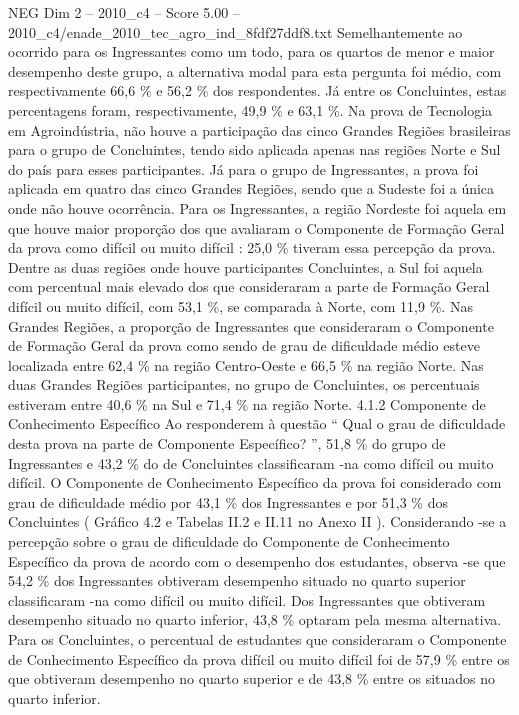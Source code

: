 \begin{textsample}{NEG Dim 2 – 2010\_c4 – Score 5.00 – 2010\_c4/enade\_2010\_tec\_agro\_ind\_8fdf27ddf8.txt}
Semelhantemente ao ocorrido para os Ingressantes como um todo, para os quartos de menor e maior desempenho deste grupo, a alternativa modal para esta pergunta foi médio, com respectivamente 66,6 \% e 56,2 \% dos respondentes.
Já entre os Concluintes, estas percentagens foram, respectivamente, 49,9 \% e 63,1 \%.
Na prova de Tecnologia em Agroindústria, não houve a participação das cinco Grandes Regiões brasileiras para o grupo de Concluintes, tendo sido aplicada apenas nas regiões Norte e Sul do país para esses participantes.
Já para o grupo de Ingressantes, a prova foi aplicada em quatro das cinco Grandes Regiões, sendo que a Sudeste foi a única onde não houve ocorrência.
Para os Ingressantes, a região Nordeste foi aquela em que houve maior proporção dos que avaliaram o Componente de Formação Geral da prova como difícil ou muito difícil : 25,0 \% tiveram essa percepção da prova.
Dentre as duas regiões onde houve participantes Concluintes, a Sul foi aquela com percentual mais elevado dos que consideraram a parte de Formação Geral difícil ou muito difícil, com 53,1 \%, se comparada à Norte, com 11,9 \%.
Nas Grandes Regiões, a proporção de Ingressantes que consideraram o Componente de Formação Geral da prova como sendo de grau de dificuldade médio esteve localizada entre 62,4 \% na região Centro-Oeste e 66,5 \% na região Norte.
Nas duas Grandes Regiões participantes, no grupo de Concluintes, os percentuais estiveram entre 40,6 \% na Sul e 71,4 \% na região Norte. 4.1.2 Componente de Conhecimento Específico Ao responderem à questão “ Qual o grau de dificuldade desta prova na parte de Componente Específico? ”, 51,8 \% do grupo de Ingressantes e 43,2 \% do de Concluintes classificaram -na como difícil ou muito difícil.
O Componente de Conhecimento Específico da prova foi considerado com grau de dificuldade médio por 43,1 \% dos Ingressantes e por 51,3 \% dos Concluintes ( Gráfico 4.2 e Tabelas II.2 e II.11 no Anexo II ).
Considerando -se a percepção sobre o grau de dificuldade do Componente de Conhecimento Específico da prova de acordo com o desempenho dos estudantes, observa -se que 54,2 \% dos Ingressantes obtiveram desempenho situado no quarto superior classificaram -na como difícil ou muito difícil.
Dos Ingressantes que obtiveram desempenho situado no quarto inferior, 43,8 \% optaram pela mesma alternativa.
Para os Concluintes, o percentual de estudantes que consideraram o Componente de Conhecimento Específico da prova difícil ou muito difícil foi de 57,9 \% entre os que obtiveram desempenho no quarto superior e de 43,8 \% entre os situados no quarto inferior.

\end{textsample}
